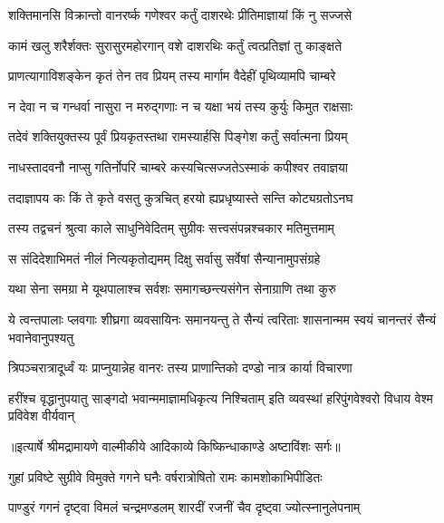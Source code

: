 \twolineshloka
{शक्तिमानसि विक्रान्तो वानरर्ष्क गणेश्वर}
{कर्तुं दाशरथेः प्रीतिमाज्ञायां किं नु सज्जसे} %

\twolineshloka
{कामं खलु शरैर्शक्तः सुरासुरमहोरगान्}
{वशे दाशरथिः कर्तुं त्वत्प्रतिज्ञां तु काङ्क्षते} %

\twolineshloka
{प्राणत्यागाविशङ्केन कृतं तेन तव प्रियम्}
{तस्य मार्गाम वैदेहीं पृथिव्यामपि चाम्बरे} %

\twolineshloka
{न देवा न च गन्धर्वा नासुरा न मरुद्गणाः}
{न च यक्षा भयं तस्य कुर्युः किमुत राक्षसाः} %

\twolineshloka
{तदेवं शक्तियुक्तस्य पूर्वं प्रियकृतस्तथा}
{रामस्यार्हसि पिङ्गेश कर्तुं सर्वात्मना प्रियम्} %

\twolineshloka
{नाधस्तादवनौ नाप्सु गतिर्नोपरि चाम्बरे}
{कस्यचित्सज्जतेऽस्माकं कपीश्वर तवाज्ञया} %

\twolineshloka
{तदाज्ञापय कः किं ते कृते वसतु कुत्रचित्}
{हरयो ह्यप्रधृष्यास्ते सन्ति कोट्यग्रतोऽनघ} %

\twolineshloka
{तस्य तद्वचनं श्रुत्वा काले साधुनिवेदितम्}
{सुग्रीवः सत्त्वसंपन्नश्चकार मतिमुत्तमाम्} %

\twolineshloka
{स संदिदेशाभिमतं नीलं नित्यकृतोद्यमम्}
{दिक्षु सर्वासु सर्वेषां सैन्यानामुपसंग्रहे} %

\twolineshloka
{यथा सेना समग्रा मे यूथपालाश्च सर्वशः}
{समागच्छन्त्यसंगेन सेनाग्राणि तथा कुरु} %

\threelineshloka
{ये त्वन्तपालाः प्लवगाः शीघ्रगा व्यवसायिनः}
{समानयन्तु ते सैन्यं त्वरिताः शासनान्मम}
{स्वयं चानन्तरं सैन्यं भवानेवानुपश्यतु} %

\twolineshloka
{त्रिपञ्चरात्रादूर्ध्वं यः प्राप्नुयान्नेह वानरः}
{तस्य प्राणान्तिको दण्डो नात्र कार्या विचारणा} %

\fourlineindentedshloka
{हरींश्च वृद्धानुपयातु साङ्गदो}
{ भवान्ममाज्ञामधिकृत्य निश्चिताम्}
{इति व्यवस्थां हरिपुंगवेश्वरो}
{ विधाय वेश्म प्रविवेश वीर्यवान्} %


{॥इत्यार्षे श्रीमद्रामायणे वाल्मीकीये आदिकाव्ये किष्किन्धाकाण्डे अष्टाविंशः सर्गः॥}


\twolineshloka
{गुहां प्रविष्टे सुग्रीवे विमुक्ते गगने घनैः}
{वर्षरात्रोषितो रामः कामशोकाभिपीडितः} %

\twolineshloka
{पाण्डुरं गगनं दृष्ट्वा विमलं चन्द्रमण्डलम्}
{शारदीं रजनीं चैव दृष्ट्वा ज्योत्स्नानुलेपनाम्} %

